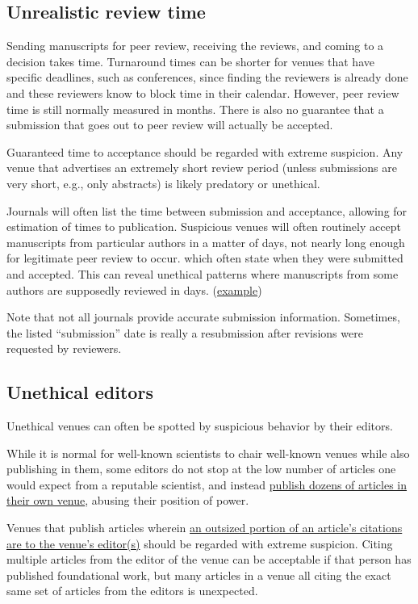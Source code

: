 \documentclass[letterpaper, 12pt]{article}
\begin{document}
\subsection*{Unrealistic review time}

Sending manuscripts for peer review, receiving the reviews, and coming to a decision takes time.
Turnaround times can be shorter for venues that have specific deadlines, such as conferences,
since finding the reviewers is already done and these reviewers know to block time in their calendar.
However, peer review time is still normally measured in months. There is also no guarantee that a submission that goes out to peer review will actually be accepted.

Guaranteed time to acceptance should be regarded with extreme suspicion. Any venue that advertises an extremely short review period (unless submissions are very short, e.g., only abstracts) is likely predatory or unethical.

Journals will often list the time between submission and acceptance, allowing for estimation of times to publication. Suspicious venues will often routinely accept manuscripts from particular authors in a matter of days, not nearly long enough for legitimate peer review to occur.
which often state when they were submitted and accepted.
This can reveal unethical patterns where manuscripts from some authors are supposedly reviewed in days.
(\href{https://deevybee.blogspot.com/2015/02/editors-behaving-badly.html}{example})

Note that not all journals provide accurate submission information. Sometimes, the listed ``submission'' date is really a resubmission after revisions were requested by reviewers.

\subsection*{Unethical editors}

Unethical venues can often be spotted by suspicious behavior by their editors.

While it is normal for well-known scientists to chair well-known venues while also publishing in them,
some editors do not stop at the low number of articles one would expect from a reputable scientist,
and instead \href{https://deevybee.blogspot.com/2020/08/pepiops-prolific-editors-who-publish-in.html}{publish dozens of articles in their own venue}, abusing their position of power.

Venues that publish articles wherein \href{https://pubpeer.com/publications/57BB3F8859A0F5BE6FBC4DB70F2E8E}{an outsized portion of an article's citations are to the venue's editor(s)} should be regarded with extreme suspicion. Citing multiple articles from the editor of the venue
can be acceptable if that person has published foundational work,
but many articles in a venue all citing the exact same set of articles from the editors is unexpected.
\end{document}
